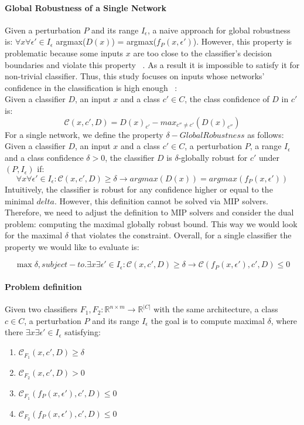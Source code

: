 \paragraph{Global Robustness of a Single Network}
Given a perturbation $P$ and its range $I_\epsilon$, a naive approach for global robustness is:
$\forall{x}\forall{\epsilon'}\in{I_\epsilon}$  argmax($D(x)$) = argmax($f_P(x,\epsilon')$).
However, this property is problematic because some inputs $x$ are too close to the classifier's decision boundaries and violate this property ~\cite{DECISIONBOUND}. As a result it is impossible to satisfy it for non-trivial classifier. Thus, this study focuses on inputs whose networks' confidence in the classification is high enough ~\cite{VHAGAR}:\\
Given a classifier $D$, an input $x$ and a class $c'\in{C}$, the class confidence of $D$ in $c'$ is:
$$\mathcal{C}(x,c',D)=D(x)_{c'}-max_{c''\ne c'}(D(x)_{c''})$$
For a single network, we define the property $\delta-Global Robustness$ as follows:\\
Given a classifier $D$, an input $x$ and a class $c'\in{C}$, a perturbation $P$, a range $I_\epsilon$ and a class confidence $\delta>0$, the classifier $D$ is $\delta$-globally robust for $c'$ under $(P,I_\epsilon)$ if:\\
$$\forall{x}\forall{\epsilon'}\in{I_\epsilon}:    \mathcal{C}(x,c',D) \geq \delta \rightarrow argmax(D(x)) = argmax(f_P(x,\epsilon')) $$
Intuitively, the classifier is robust for any confidence higher or equal to the minimal $delta$. However, this definition cannot be solved via MIP solvers. Therefore, we need to adjust the definition to MIP solvers and consider the dual problem: computing the maximal globally robust bound. This way we would look for the maximal $\delta$ that violates the constraint. Overall, for a single classifier the property we would like to evaluate is:

$$\max{\delta}, subject-to. \exists{x}\exists{\epsilon'}\in{I_\epsilon}: \mathcal{C}(x,c',D) \geq \delta \rightarrow \mathcal{C}(f_P(x,\epsilon'),c',D)\leq 0$$

\paragraph{Problem definition} Given two classifiers $F_1,F_2: \mathbb{R}^{n \times m} \rightarrow {\mathbb{R}}^{|C|}$ with the same architecture, a class $c\in{C}$, a perturbation $P$ and its range $I_\epsilon$ the goal is to compute maximal $\delta$, where there $\exists{x}\exists{\epsilon'}\in{I_\epsilon}$ satisfying:

\begin{enumerate}
    \item $\mathcal{C}_{F_1}(x,c',D) \geq \delta$
    \item $\mathcal{C}_{F_2}(x,c',D) > 0$
    \item $\mathcal{C}_{F_1}(f_P(x,\epsilon'),c',D)\leq 0$
    \item $\mathcal{C}_{F_2}(f_P(x,\epsilon'),c',D)\leq 0$
\end{enumerate}
